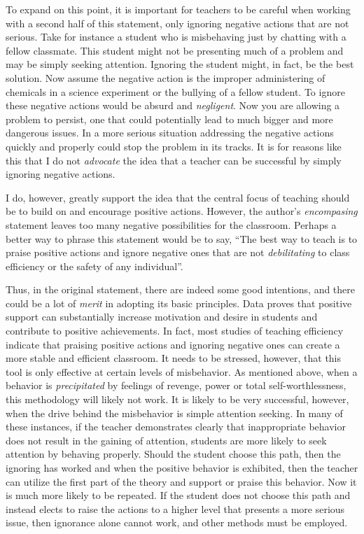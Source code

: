 To expand on this point, it is important for teachers to be careful when working with a second half of this statement, only ignoring negative actions that are not serious.
Take for instance a student who is misbehaving just by chatting with a fellow classmate.
This student might not be presenting much of a problem and may be simply seeking attention.
Ignoring the student might, in fact, be the best solution.
Now assume the negative action is the improper administering of chemicals in a science experiment or the bullying of a fellow student.
To ignore these negative actions would be absurd and \emph{negligent}.
Now you are allowing a problem to persist, one that could potentially lead to much bigger and more dangerous issues.
In a more serious situation addressing the negative actions quickly and properly could stop the problem in its tracks.
It is for reasons like this that I do not \emph{advocate} the idea that a teacher can be successful by simply ignoring negative actions.

I do, however, greatly support the idea that the central focus of teaching should be to build on and encourage positive actions.
However, the author's \emph{encompasing} statement leaves too many negative possibilities for the classroom.
Perhaps a better way to phrase this statement would be to say, ``The best way to teach is to praise positive actions and ignore negative ones that are not \emph{debilitating} to class efficiency or the safety of any individual''.

Thus, in the original statement, there are indeed some good intentions, and there could be a lot of \emph{merit} in adopting its basic principles.
Data proves that positive support can substantially increase motivation and desire in students and contribute to positive achievements.
In fact, most studies of teaching efficiency indicate that praising positive actions and ignoring negative ones can create a more stable and efficient classroom.
It needs to be stressed, however, that this tool is only effective at certain levels of misbehavior.
As mentioned above, when a behavior is \emph{precipitated} by feelings of revenge, power or total self-worthlessness, this methodology will likely not work.
It is likely to be very successful, however, when the drive behind the misbehavior is simple attention seeking.
In many of these instances, if the teacher demonstrates clearly that inappropriate behavior does not result in the gaining of attention, students are more likely to seek attention by behaving properly.
Should the student choose this path, then the ignoring has worked and when the positive behavior is exhibited, then the teacher can utilize the first part of the theory and support or praise this behavior.
Now it is much more likely to be repeated.
If the student does not choose this path and instead elects to raise the actions to a higher level that presents a more serious issue, then ignorance alone cannot work, and other methods must be employed.

